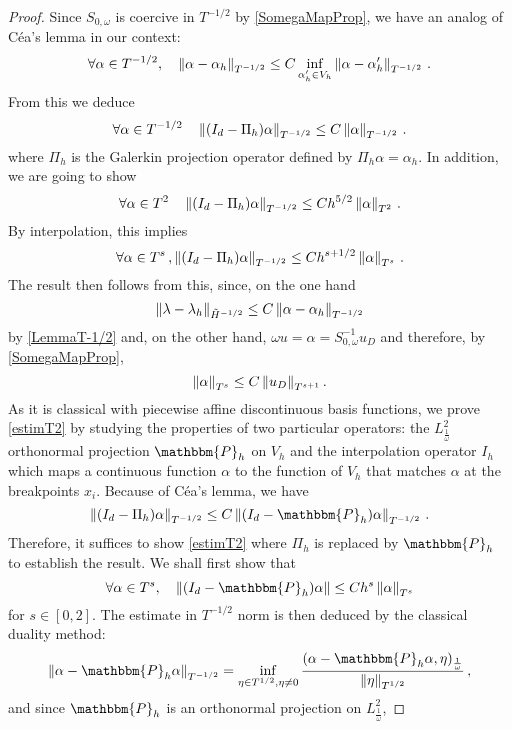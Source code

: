 \documentclass[a4paper]{article}
\begin{document}
\begin{proof}
Since $S_{0,\omega}$ is coercive in $T^{-1/2}$ by \autoref{SomegaMapProp}, we have an analog of Céa's lemma in our context: 
\begin{equation}
\forall \alpha \in T^{-1/2},\quad \left\|\alpha - \alpha_h\right\|_{T^{-1/2}} \leq C \inf_{\alpha_h' \in V_h } \left\|\alpha - \alpha'_h\right\|_{T^{-1/2}}\,.
\label{CeaAnalog}
\end{equation}
From this we deduce 
\[\forall \alpha \in T^{-1/2}\quad \left\|(I_d - \Pi_h)\alpha\right\|_{T^{-1/2}} \leq C \left\|\alpha\right\|_{T^{-1/2}}\,.\]
where $\Pi_h$ is the Galerkin projection operator defined by $\Pi_h \alpha = \alpha_h$. 
In addition, we are going to show 
\begin{equation}
	\forall \alpha \in T^{2}\quad \left\|(I_d - \Pi_h)\alpha\right\|_{T^{-1/2}} \leq C h^{5/2} \left\|\alpha\right\|_{T^{2}}\,.
	\label{estimT2}
\end{equation}
By interpolation, this implies 
\[\forall \alpha \in T^s\,, \left\|(I_d - \Pi_h) \alpha\right\|_{T^{-1/2}} \leq C h^{s + 1/2} \left\|\alpha\right\|_{T^s}\,.\]
The result then follows from this, since, on the one hand
\[\left\|\lambda - \lambda_h\right\|_{\tilde{H}^{-1/2}} \leq C \left\|\alpha - \alpha_h\right\|_{T^{-1/2}}\]
by \autoref{LemmaT-1/2} and, on the other hand, $\omega u = \alpha = S_{0,\omega}^{-1} u_D$ and therefore, by \autoref{SomegaMapProp},
\[\left\|\alpha\right\|_{T^s} \leq C\left\|u_D\right\|_{T^{s+1}}.\]
As it is classical with piecewise affine discontinuous basis functions, we prove \eqref{estimT2} by studying the properties of two particular operators: the $L^2_\frac{1}{\omega}$ orthonormal projection $\mathbbm{P}_h$ on $V_h$ and the interpolation operator $I_h$ which maps a continuous function $\alpha$ to the function  of $V_h$ that matches $\alpha$ at the breakpoints $x_i$. Because of Céa's lemma, we have 
\[\norm{(I_d - \Pi_h) \alpha}_{T^{-1/2}} \leq C \norm{(I_d - \mathbbm{P}_h) \alpha}_{T^{-1/2}} \,.\]
Therefore, it suffices to show \eqref{estimT2} where $\Pi_h$ is replaced by $\mathbbm{P}_h$ to establish the result. We shall first show that 
\begin{equation}
	\forall \alpha \in T^s, \quad \norm{(I_d - \mathbbm{P}_h)\alpha} \leq Ch^s \norm{\alpha}_{T^s}
	\label{WeshallFirstShow}
\end{equation}
for $s \in [0,2]$. The estimate in $T^{-1/2}$ norm is then deduced by the classical duality method:
\[\norm{\alpha - \mathbbm{P}_h \alpha}_{T^{-1/2}} = \inf_{\eta \in T^{1/2}, \eta \neq 0} \dfrac{(\alpha - \mathbbm{P}_h \alpha,\eta)_{\frac{1}{\omega}}}{\norm{\eta}_{T^{1/2}}}\,,\]
and since $\mathbbm{P}_h$ is an orthonormal projection on $L^2_\frac{1}{\omega}$, 

\end{proof}
\end{document}
